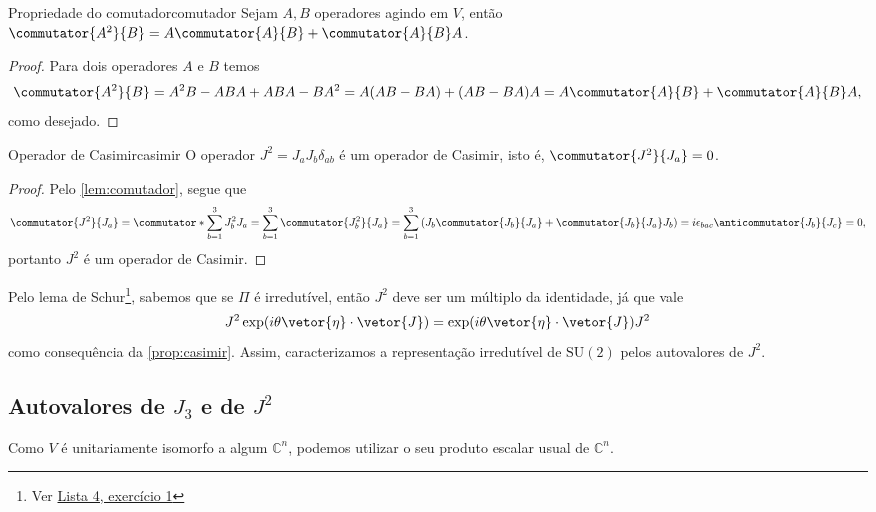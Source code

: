 \begin{lemma}{Propriedade do comutador}{comutador}
    Sejam \(A, B\) operadores agindo em \(V\), então \(\commutator{A^2}{B} = A\commutator{A}{B} + \commutator{A}{B}A\).
\end{lemma}
\begin{proof}
    Para dois operadores \(A\) e \(B\) temos
    \begin{equation*}
        \commutator{A^2}{B} = A^2 B - ABA + ABA - BA^2 = A(AB - BA) + (AB - BA)A = A\commutator{A}{B} + \commutator{A}{B}A,
    \end{equation*}
    como desejado.
\end{proof}

\begin{proposition}{Operador de Casimir}{casimir}
    O operador \(J^2 = J_a J_b \delta_{ab}\) é um operador de Casimir, isto é, \(\commutator{J^2}{J_a} = 0\).
\end{proposition}
\begin{proof}
    Pelo \cref{lem:comutador}, segue que
    \begin{equation*}
        \commutator{J^2}{J_a} = \commutator*{\sum_{b = 1}^3 J_b^2}{J_a} = \sum_{b = 1}^3\commutator{J_b^2}{J_a} = \sum_{b = 1}^3 \left(J_b\commutator{J_b}{J_a} + \commutator{J_b}{J_a}J_b\right) = i \epsilon_{bac} \anticommutator{J_b}{J_c} = 0,
    \end{equation*}
    portanto \(J^2\) é um operador de Casimir.
\end{proof}
\begin{remark}
    Pelo lema de Schur\footnote{Ver \href{https://github.com/louisradial/4300429-grupos-e-tensores/releases/tag/lista4}{Lista 4, exercício 1}}, sabemos que se \(\Pi\) é irredutível, então \(J^2\) deve ser um múltiplo da identidade, já que vale
    \begin{equation*}
        J^2 \exp(i \theta \vetor{\eta}\cdot \vetor{J}) = \exp(i\theta\vetor{\eta}\cdot\vetor{J})J^2
    \end{equation*}
    como consequência da \cref{prop:casimir}. Assim, caracterizamos a representação irredutível de \(\mathrm{SU}(2)\) pelos autovalores de \(J^2\).
\end{remark}

\subsection[Autovalores de J₃ e de J²]{Autovalores de \(J_3\) e de \(J^2\)}
Como \(V\) é unitariamente isomorfo a algum \(\mathbb{C}^n\), podemos utilizar o seu produto escalar usual de \(\mathbb{C}^n\).

